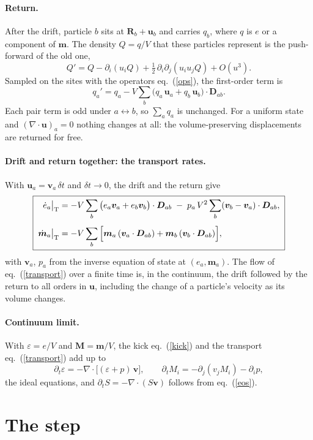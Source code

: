 \documentclass[11pt,aps,preprint,nofootinbib,superscriptaddress,tightenlines]{revtex4-2}
\def\st{\begin{equation}}
\def\stp{\end{equation}}
\def\Eq#1{eq.~(\ref{#1})}
\let\oldparagraph\paragraph
\renewcommand{\paragraph}{\par\bigskip\oldparagraph}
\begin{document}
\paragraph{Return.}  After the drift, particle $b$ sits at $\bm R_b+\bm u_b$ and carries
$q_b$, where $q$ is $e$ or a component of $\bm m$.  The density $Q=q/V$ that these
particles represent is the push-forward of the old one,
\st
Q'=Q-\partial_i(u_iQ)+\tfrac12\,\partial_i\partial_j(u_iu_jQ)+O(u^3) .
\label{push}
\stp
Sampled on the sites with the operators \Eq{ops}, the first-order term is
\st
q_a'=q_a-V\sum_b\big(q_a\,\bm u_a+q_b\,\bm u_b\big)\cdot\bm D_{ab} .
\label{return}
\stp
Each pair term is odd under $a\leftrightarrow b$, so $\sum_aq_a$ is unchanged.  For a
uniform state and $(\nabla\cdot\bm u)_a=0$ nothing changes at all: the
volume-preserving displacements are returned for free.

\paragraph{Drift and return together: the transport rates.}  With
$\bm u_a=\bm v_a\,\delta t$ and $\delta t\to0$, the drift and the return give
\st
\boxed{\;
\begin{aligned}
\dot e_a\big|_{\rm T}&=-V\sum_b\big(e_a\bm v_a+e_b\bm v_b\big)\cdot\bm D_{ab}
\;-\;p_a\,V^2\sum_b(\bm v_b-\bm v_a)\cdot\bm D_{ab},\\[4pt]
\dot{\bm m}_a\big|_{\rm T}&=-V\sum_b\Big[\bm m_a\,(\bm v_a\cdot\bm D_{ab})
+\bm m_b\,(\bm v_b\cdot\bm D_{ab})\Big],
\end{aligned}\;}
\label{transport}
\stp
with $\bm v_a$, $p_a$ from the inverse equation of state at $(e_a,\bm m_a)$.  The flow
of \Eq{transport} over a finite time is, in the continuum, the drift followed by the
return to all orders in $\bm u$, including the change of a particle's velocity as its
volume changes.

\paragraph{Continuum limit.}  With $\varepsilon=e/V$ and $\bm M=\bm m/V$, the kick
\Eq{kick} and the transport \Eq{transport} add up to
\st
\partial_t\varepsilon=-\nabla\cdot\big[(\varepsilon+p)\,\bm v\big],\qquad
\partial_tM_i=-\partial_j(v_jM_i)-\partial_ip ,
\stp
the ideal equations, and $\partial_tS=-\nabla\cdot(S\bm v)$ follows from \Eq{eos}.

\section{The step}
\label{sec:step}
\end{document}
